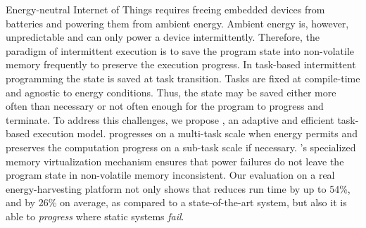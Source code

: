 
Energy-neutral Internet of Things requires freeing embedded devices from batteries and powering them from ambient energy. Ambient energy is, however, unpredictable and can only power a device intermittently. Therefore, the paradigm of intermittent execution is to save the program state into non-volatile memory frequently to preserve the execution progress. In task-based intermittent programming the state is saved at task transition. Tasks are fixed at compile-time and agnostic to energy conditions. Thus, the state may be saved either more often than necessary or not often enough for the program to progress and terminate. To address this challenges, we propose \sys, an adaptive and efficient task-based execution model. \sys progresses on a multi-task scale when energy permits and preserves the computation progress on a sub-task scale if necessary. \sys's specialized memory virtualization mechanism ensures that power failures do not leave the program state in non-volatile memory inconsistent. Our evaluation on a real energy-harvesting platform not only shows that \sys reduces run time by up to 54\%, and by 26\% on average, as compared to a state-of-the-art system, but also it is able to \emph{progress} where static systems \emph{fail}.